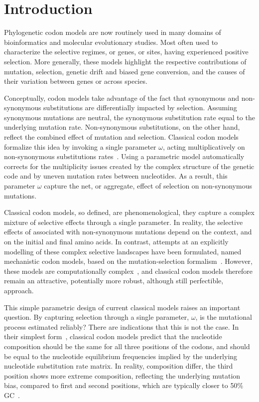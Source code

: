 
\section{Introduction}

Phylogenetic codon models are now routinely used in many domains of bioinformatics and molecular evolutionary studies.
Most often used to characterize the selective regimes, or genes, or sites, having experienced positive selection.
More generally, these models highlight the respective contributions of mutation, selection, genetic drift and biased gene conversion, and the causes of their variation between genes or across species.

Conceptually, codon models take advantage of the fact that synonymous and non-synonymous substitutions are differentially impacted by selection.
Assuming synonymous mutations are neutral, the synonymous substitution rate equal to the underlying mutation rate.
Non-synonymous substitutions, on the other hand, reflect the combined effect of mutation and selection.
Classical codon models formalize this idea by invoking a single parameter $\omega$, acting multiplicatively on non-synonymous substitutions rates~\citep{Muse1994, Goldman1994}.
Using a parametric model automatically corrects for the multiplicity issues created by the complex structure of the genetic code and by uneven mutation rates between nucleotides.
As a result, this parameter $\omega$ capture the net, or aggregate, effect of selection on non-synonymous mutations.

Classical codon models, so defined, are phenomenological, they capture a complex mixture of selective effects through a single parameter.
In reality, the selective effects of associated with non-synonymous mutations depend on the context, and on the initial and final amino acids.
In contrast, attempts at an explicitly modelling of these complex selective landscapes have been formulated, named mechanistic codon models, based on the mutation-selection formalism~\citep{Halpern1998}.
However, these models are computationally complex~\citep{Rodrigue2010, Tamuri2012}, and classical codon models therefore remain an attractive, potentially more robust, although still perfectible, approach.

This simple parametric design of current classical models raises an important question.
By capturing selection through a single parameter, $\omega$, is the mutational process estimated reliably?
There are indications that this is not the case.
In their simplest form~\citep{Muse1994}, classical codon models predict that the nucleotide composition should be the same for all three positions of the codons, and should be equal to the nucleotide equilibrium frequencies implied by the underlying nucleotide substitution rate matrix.
In reality, composition differ, the third position shows more extreme composition, reflecting the underlying mutation bias, compared to first and second positions, which are typically closer to 50\% GC~\citep{Singer2000}.

